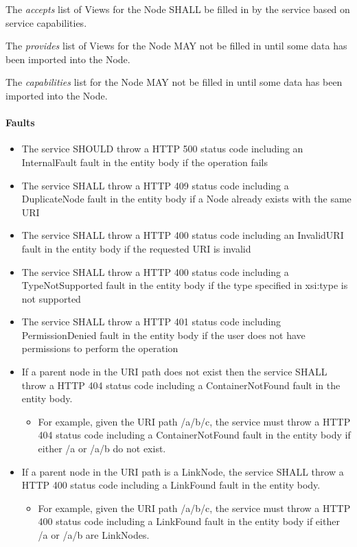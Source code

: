 \documentclass[11pt,a4paper]{ivoa}
\begin{document}
The \emph{accepts} list of Views for the Node SHALL be filled in by the service based on service capabilities.

The \emph{provides} list of Views for the Node MAY not be filled in until some data has been imported into the Node.

The \emph{capabilities} list for the Node MAY not be filled in until some data has been imported into the Node.

\paragraph{Faults}
\begin{itemize}
    \item The service SHOULD throw a HTTP 500 status code including an InternalFault fault in the entity body if the operation fails
    \item The service SHALL throw a HTTP 409 status code including a DuplicateNode fault in the entity body if a Node already exists with the same URI
    \item The service SHALL throw a HTTP 400 status code including an InvalidURI fault in the entity body if the requested URI is invalid
    \item The service SHALL throw a HTTP 400 status code including a TypeNotSupported fault in the entity body if the type specified in xsi:type is not supported
    \item The service SHALL throw a HTTP 401 status code including PermissionDenied fault in the entity body if the user does not have permissions to perform the operation
    \item If a parent node in the URI path does not exist then the service SHALL throw a HTTP 404 status code including a ContainerNotFound fault in the entity body.
    \begin{itemize}
        \item For example, given the URI path /a/b/c, the service must throw a HTTP 404 status code including a ContainerNotFound fault in the entity body if either /a or /a/b do not exist.
    \end{itemize}
    \item If a parent node in the URI path is a LinkNode, the service SHALL throw a HTTP 400 status code including a LinkFound fault in the entity body.
        \begin{itemize}
        \item For example, given the URI path /a/b/c, the service must throw a HTTP 400 status code including a LinkFound fault in the entity body if either /a or /a/b are LinkNodes.
    \end{itemize}
\end{itemize}
\end{document}

